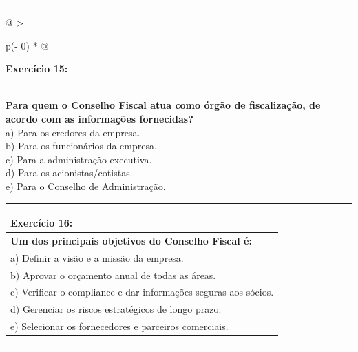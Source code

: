 \documentclass[
]{book}
\begin{document}
\begin{center}\rule{0.5\linewidth}{0.5pt}\end{center}

\begin{longtable}[]{@{}
  >{\raggedright\arraybackslash}p{(\columnwidth - 0\tabcolsep) * }@{}}
\toprule\noalign{}
\begin{minipage}[b]{\linewidth}\raggedright
\textbf{Exercício 15:}
\end{minipage} \\
\midrule\noalign{}
\endhead
\bottomrule\noalign{}
\endlastfoot
\textbf{Para quem o Conselho Fiscal atua como órgão de fiscalização, de acordo com as informações fornecidas?} \\
a) Para os credores da empresa. \\
b) Para os funcionários da empresa. \\
c) Para a administração executiva. \\
d) Para os acionistas/cotistas. \\
e) Para o Conselho de Administração. \\
\end{longtable}

\begin{center}\rule{0.5\linewidth}{0.5pt}\end{center}

\begin{longtable}[]{@{}l@{}}
\toprule\noalign{}
\textbf{Exercício 16:} \\
\midrule\noalign{}
\endhead
\bottomrule\noalign{}
\endlastfoot
\textbf{Um dos principais objetivos do Conselho Fiscal é:} \\
a) Definir a visão e a missão da empresa. \\
b) Aprovar o orçamento anual de todas as áreas. \\
c) Verificar o compliance e dar informações seguras aos sócios. \\
d) Gerenciar os riscos estratégicos de longo prazo. \\
e) Selecionar os fornecedores e parceiros comerciais. \\
\end{longtable}

\begin{center}\rule{0.5\linewidth}{0.5pt}\end{center}
\end{document}
